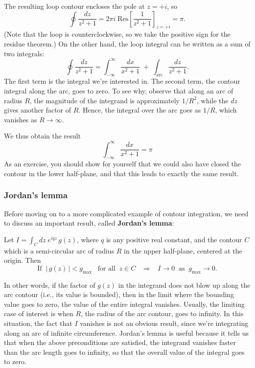 \documentclass[10pt,a4paper]{article}
\begin{document}
The resulting loop contour encloses the pole at $z = +i$, so
\begin{equation}
\oint \frac{dz}{z^2+1} = 2\pi i \; \mathrm{Res}\left[\frac{1}{z^2 + 1}\right]_{z = +i} = \pi.
\end{equation}
(Note that the loop is counterclockwise, so we take the positive sign
for the residue theorem.) On the other hand, the loop integral can be
written as a sum of two integrals:
\begin{equation}
\oint \frac{dz}{z^2 + 1} = \int_{-\infty}^\infty \frac{dx}{x^2 + 1} \;+\; \int_{\mathrm{arc}} \frac{dz}{z^2 + 1}.
\end{equation}
The first term is the integral we're interested in. The second term,
the contour integral along the arc, goes to zero. To see why, observe
that along an arc of radius $R$, the magnitude of the integrand is
approximately $1/R^{2}$, while the $dz$ gives another factor of
$R$. Hence, the integral over the arc goes as $1/R$, which vanishes as
$R \rightarrow \infty$.

We thus obtain the result
\begin{equation}
\int_{-\infty}^\infty \frac{dx}{x^2 + 1} = \pi
\end{equation}
As an exercise, you should show for yourself that we could also have
closed the contour in the lower half-plane, and that this leads to
exactly the same result.

\subsubsection{Jordan's lemma}\label{jordans-lemma}

Before moving on to a more complicated example of contour integration,
we need to discuss an important result, called \textbf{Jordan's
  lemma}:

\begin{framed} \noindent
  Let $I = \int_C dz \; e^{iqz} \,g(z)$, where $q$ is any positive
  real constant, and the contour $C$ which is a semi-circular arc of
  radius $R$ in the upper half-plane, centered at the origin.  Then
  \begin{equation}
    \text{If}\;\; \big|\,g(z)\,\big| < g_{\mathrm{max}} \;\;\;\text{for all}\;\;z \in C \;\;\;\Rightarrow \;\;\; I \rightarrow 0 \;\;\mathrm{as}\;\; g_{\mathrm{max}} \rightarrow 0.
  \end{equation}
\end{framed}

In other words, if the factor of $g(z)$ in the integrand does not blow
up along the arc contour (i.e., its value is bounded), then in the
limit where the bounding value goes to zero, the value of the entire
integral vanishes. Usually, the limiting case of interest is when $R$,
the radius of the arc contour, goes to infinity. In this situation,
the fact that $I$ vanishes is not an obvious result, since we're
integrating along an arc of infinite circumference. Jordan's lemma is
useful because it tells us that when the above preconditions are
satisfied, the integrand vanishes faster than the arc length goes to
infinity, so that the overall value of the integral goes to zero.
\end{document}
